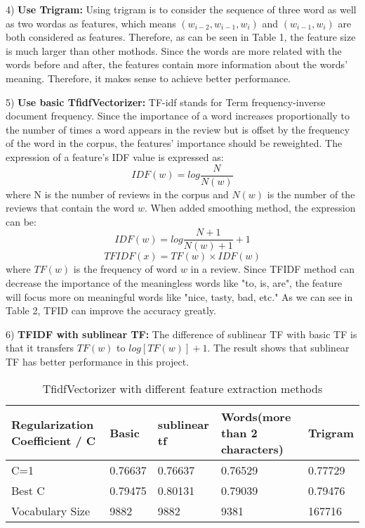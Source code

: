 \documentclass[letterpaper, 10 pt, conference]{ieeeconf}  %
\begin{document}
4) \textbf{Use Trigram: }Using trigram is to consider the sequence of three word as well as two wordas as features, which means $(w_{i-2},w_{i-1},w_i)$ and $(w_{i-1},w_i)$ are both considered as features. Therefore, as can be seen in Table 1, the feature size is much larger than other mothods. Since the words are more related with the words before and after, the features contain more information about the words' meaning. Therefore, it makes sense to achieve better performance.

5) \textbf{Use basic TfidfVectorizer: }TF-idf stands for Term frequency-inverse document frequency. Since the importance of a word increases proportionally to the number of times a word appears in the review but is offset by the frequency of the word in the corpus, the features' importance should be reweighted. The expression of a feature's IDF value is expressed as:
\begin{equation}
IDF(w)=log\frac{N}{N(w)}
\end{equation}
where N is the number of reviews in the corpus and $N(w)$ is the number of the reviews that contain the word $w$. When added smoothing method, the expression can be:
\begin{equation}
IDF(w)=log\frac{N+1}{N(w)+1}+1
\end{equation}
\begin{equation}
TFIDF(x)=TF(w)\times IDF(w)
\end{equation}
where $TF(w)$ is the frequency of word $w$ in a review. Since TFIDF method can decrease the importance of the meaningless words like "to, is, are", the feature will focus more on meaningful words like "nice, tasty, bad, etc." As we can see in Table 2, TFID can improve the accuracy greatly.

6) \textbf{TFIDF with sublinear TF: }The difference of sublinear TF with basic TF is that it transfers $TF(w)$ to $log[TF(w)]+1$. The result shows that sublinear TF has better performance in this project. 



\begin{table}  
	\caption{TfidfVectorizer with different feature extraction methods}  
	\begin{center}  
		\begin{tabu} to 1\textwidth{X[3,c]|X[1,b]|X[2,l]|X[3,c]|X[2,m]}  
			\hline  
			Regularization Coefficient / C  &Basic             &sublinear tf      &Words(more than 2 characters)         &Trigram\\  
			\hline  
			C=1    &0.76637       &0.76637           &0.76529    &0.77729      \\  
			Best C    &0.79475      &0.80131           &0.79039    &0.79476     \\  
			Vocabulary Size    &9882      &9882           &9381         &167716\\  
			
			\hline  
		\end{tabu}  
	\end{center}  
\end{table} 
\end{document}
